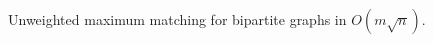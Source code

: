 Unweighted maximum matching for bipartite graphs in $O(m\sqrt{n})$.

\inputminted{cpp}{src/graph/matching/hopcoft-karp-algorithm.cpp.com}

